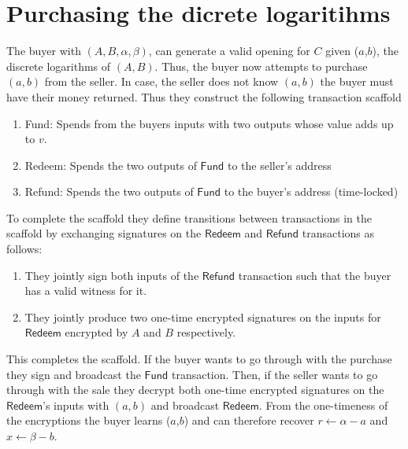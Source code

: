 \documentclass{article}
\begin{document}
\section{Purchasing the dicrete logaritihms}

\newcommand{\I}{\mathbf{I}}
\renewcommand{\i}{\mathbf{i}}
\newcommand{\addr}{\texttt{addr}}
\newcommand{\Tx}{\textsf{Tx}}
\newcommand{\Fund}{\textsf{Fund}}
\newcommand{\Refund}{\textsf{Refund}}
\newcommand{\Redeem}{\textsf{Redeem}}

The buyer with $(A,B,\alpha,\beta)$, can generate a valid opening for $C$ given ($a$,$b$), the discrete logarithms of $(A,B)$. Thus, the buyer now attempts to purchase $(a,b)$ from the seller. In case, the seller does not know $(a,b)$ the buyer must have their money returned. Thus they construct the following transaction scaffold

\begin{enumerate}
\item \Fund: Spends from the buyers inputs with two outputs whose value adds up to $v$.
\item \Redeem: Spends the two outputs of $\Fund$ to the seller's address
\item \Refund: Spends the two outputs of $\Fund$ to the buyer's address (time-locked)
\end{enumerate}

To complete the scaffold they define transitions between transactions in the scaffold by exchanging signatures on the $\Redeem$ and $\Refund$ transactions as follows:

\begin{enumerate}
\item They jointly sign both inputs of the $\Refund$ transaction such that the buyer has a valid witness for it.
\item They jointly produce two one-time encrypted signatures \cite{onetimeves} on the inputs for $\Redeem$ encrypted by $A$ and $B$ respectively.
\end{enumerate}

This completes the scaffold. If the buyer wants to go through with the purchase they sign and broadcast the $\Fund$ transaction. Then, if the seller wants to go through with the sale they decrypt both one-time encrypted signatures on the $\Redeem$'s inputs with $(a,b)$ and broadcast $\Redeem$. From the one-timeness of the encryptions the buyer learns ($a$,$b$) and can therefore recover $r \gets \alpha - a$ and $x \gets \beta - b$.

{}

\end{document}

